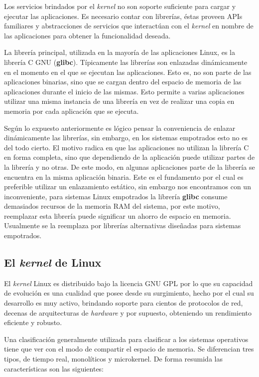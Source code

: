 Los servicios brindados por el \emph{kernel} no son soporte suficiente para
cargar y ejecutar las aplicaciones. Es necesario contar con librerías, éstas
proveen APIs familiares y abstracciones de servicios que interactúan con el
\emph{kernel} en nombre de las aplicaciones para obtener la funcionalidad
deseada.

La librería principal, utilizada en la mayoría de las aplicaciones Linux, es la
librería C GNU (\textbf{glibc}). Típicamente las librerías son enlazadas
dinámicamente en el momento en el que se ejecutan las aplicaciones. Esto es, no
son parte de las aplicaciones binarias, sino que se cargan dentro del espacio de
memoria de las aplicaciones durante el inicio de las mismas. Esto permite a
varias aplicaciones utilizar una misma instancia de una librería en vez de
realizar una copia en memoria por cada aplicación que se ejecuta.

Según lo expuesto anteriormente es lógico pensar la conveniencia de enlazar
dinámicamente las librerías, sin embargo, en los sistemas empotrados esto no es
del todo cierto. El motivo radica en que las aplicaciones no utilizan la
librería C en forma completa, sino que dependiendo de la aplicación puede
utilizar partes de la librería y no otras. De este modo, en algunas aplicaciones
parte de la librería se encuentra en la misma aplicación binaria. Este es el
fundamento por el cual es preferible utilizar un enlazamiento estático, sin
embargo nos encontramos con un inconveniente, para sistemas Linux empotrados la
librería \textbf{glibc} consume demasiados recursos de la memoria RAM del
sistema, por este motivo, reemplazar esta librería puede significar un ahorro de
espacio en memoria. Usualmente se la reemplaza por librerías alternativas
diseñadas para sistemas empotrados.

\subsection{El \emph{kernel} de Linux}

El \emph{kernel} Linux es distribuido bajo la licencia GNU GPL por lo que su
capacidad de evolución es una cualidad que posee desde su surgimiento, hecho por
el cual su desarrollo es muy activo, brindando soporte para cientos de
protocolos de red, decenas de arquitecturas de \emph{hardware} y por supuesto,
obteniendo un rendimiento eficiente y robusto\cite{emiliano}.

Una clasificación generalmente utilizada para clasificar a los sistemas
operativos tiene que ver con el modo de compartir el espacio de memoria. Se
diferencian tres tipos, de tiempo real, monolíticos y microkernel.
De forma resumida las características son las siguientes:

